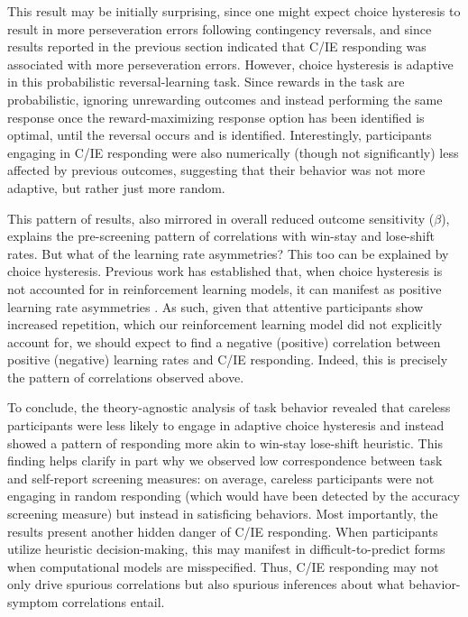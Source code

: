 \documentclass[a4paper,notitlepage,12pt]{article}
\begin{document}
This result may be initially surprising, since one might expect choice hysteresis to result in more perseveration errors following contingency reversals, and since results reported in the previous section indicated that C/IE responding was associated with more perseveration errors. However, choice hysteresis is adaptive in this probabilistic reversal-learning task. Since rewards in the task are probabilistic, ignoring unrewarding outcomes and instead performing the same response once the reward-maximizing response option has been identified is optimal, until the reversal occurs and is identified. Interestingly, participants engaging in C/IE responding were also numerically (though not significantly) less affected by previous outcomes, suggesting that their behavior was not more adaptive, but rather just more random.

This pattern of results, also mirrored in overall reduced outcome sensitivity ($\beta$), explains the pre-screening pattern of correlations with win-stay and lose-shift rates. But what of the learning rate asymmetries? %
This too can be explained by choice hysteresis. Previous work has established that, when choice hysteresis is not accounted for in reinforcement learning models, it can manifest as positive learning rate asymmetries \cite{Katahira2018-ke}. As such, given that attentive participants show increased repetition, which our reinforcement learning model did not explicitly account for, we should expect to find a negative (positive) correlation between positive (negative) learning rates and C/IE responding. Indeed, this is precisely the pattern of correlations observed above.

To conclude, the theory-agnostic analysis of task behavior revealed that careless participants were less likely to engage in adaptive choice hysteresis and instead showed a pattern of responding more akin to win-stay lose-shift heuristic. This finding helps clarify in part why we observed low correspondence between task and self-report screening measures: on average, careless participants were not engaging in random responding (which would have been detected by the accuracy screening measure) but instead in satisficing behaviors. Most importantly, the results present another hidden danger of C/IE responding. When participants utilize heuristic decision-making, this may manifest in difficult-to-predict forms when computational models are misspecified. Thus, C/IE responding may not only drive spurious correlations but also spurious inferences about what behavior-symptom correlations entail.
\end{document}
